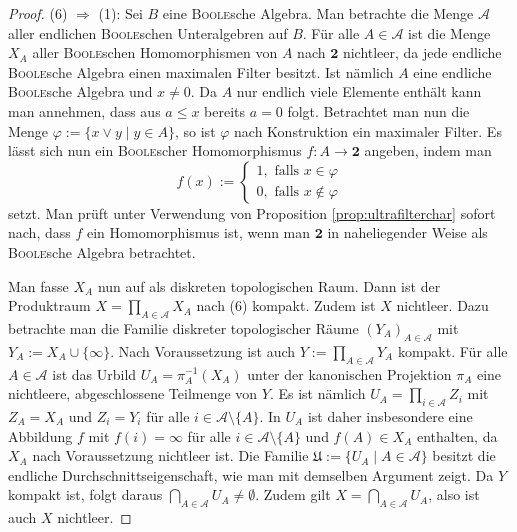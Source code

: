 \begin{proof}
  (6) $\Rightarrow$ (1):
  Sei $B$ eine \textsc{Boole}sche Algebra.
  Man betrachte die Menge $\mathcal{A}$ aller endlichen \textsc{Boole}schen Unteralgebren auf $B$.
  Für alle $A \in \mathcal{A}$ ist die Menge $X_A$ aller \textsc{Boole}schen Homomorphismen von $A$ nach $\mathbf{2}$ nichtleer, da jede endliche \textsc{Boole}sche Algebra einen maximalen Filter besitzt.
  Ist nämlich $A$ eine endliche \textsc{Boole}sche Algebra und $x \neq 0$.
  Da $A$ nur endlich viele Elemente enthält kann man annehmen, dass aus $a \leq x$ bereits $a = 0$ folgt.
  Betrachtet man nun die Menge $\varphi := \{x \lor y \mid y \in A\}$, so ist $\varphi$ nach Konstruktion ein maximaler Filter.
  Es lässt sich nun ein \textsc{Boole}scher Homomorphismus $f \colon A \to \mathbf{2}$ angeben, indem man 
  \begin{displaymath}
    f(x) := 
    \begin{cases}
      1, \text{ falls } x \in \varphi \\
      0, \text{ falls } x \not\in \varphi
    \end{cases}
  \end{displaymath}
  setzt.
  Man prüft unter Verwendung von Proposition \ref{prop:ultrafilterchar} sofort nach, dass $f$ ein Homomorphismus ist, wenn man $\mathbf{2}$ in naheliegender Weise als \textsc{Boole}sche Algebra betrachtet.

  Man fasse $X_A$ nun auf als diskreten topologischen Raum.
  Dann ist der Produktraum $X = \prod_{A \in \mathcal{A}} X_A$ nach (6) kompakt.
  Zudem ist $X$ nichtleer.
  Dazu betrachte man die Familie diskreter topologischer Räume $(Y_A)_{A \in \mathcal{A}}$ mit $Y_A := X_A \cup \{\infty\}$.
  Nach Voraussetzung ist auch $Y := \prod_{A \in \mathcal{A}} Y_A$ kompakt.
  Für alle $A \in \mathcal{A}$ ist das Urbild $U_A = \pi_A^{-1}(X_A)$ unter der kanonischen Projektion $\pi_A$ eine nichtleere, abgeschlossene Teilmenge von $Y$.
  Es ist nämlich $U_A = \prod_{i \in \mathcal{A}} Z_i$ mit $Z_A = X_A$ und $Z_i = Y_i$ für alle $i \in \mathcal{A} \setminus \{A\}$.
  In $U_A$ ist daher insbesondere eine Abbildung $f$ mit $f(i) = \infty$ für alle $i \in \mathcal{A} \setminus \{A\}$ und $f(A) \in X_A$ enthalten, da $X_A$ nach Voraussetzung nichtleer ist.
  Die Familie $\mathfrak{U} := \{U_A \mid A \in \mathcal{A}\}$ besitzt die endliche Durchschnittseigenschaft, wie man mit demselben Argument zeigt.
  Da $Y$ kompakt ist, folgt daraus $\bigcap_{A \in \mathcal{A}} U_A \neq \emptyset$.
  Zudem gilt $X = \bigcap_{A \in \mathcal{A}} U_A$, also ist auch $X$ nichtleer.


\end{proof}
